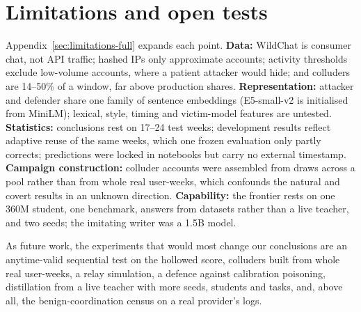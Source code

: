 \section{Limitations and open tests}
\label{sec:limitations}

Appendix~\ref{sec:limitations-full} expands each point. \textbf{Data:} WildChat is consumer chat, not API traffic; hashed IPs only approximate accounts; activity thresholds exclude low-volume accounts, where a patient attacker would hide; and colluders are 14--50\% of a window, far above production shares. \textbf{Representation:} attacker and defender share one family of sentence embeddings (E5-small-v2 is initialised from MiniLM); lexical, style, timing and victim-model features are untested. \textbf{Statistics:} conclusions rest on 17--24 test weeks; development results reflect adaptive reuse of the same weeks, which one frozen evaluation only partly corrects; predictions were locked in notebooks but carry no external timestamp. \textbf{Campaign construction:} colluder accounts were assembled from draws across a pool rather than from whole real user-weeks, which confounds the natural and covert results in an unknown direction. \textbf{Capability:} the frontier rests on one 360M student, one benchmark, answers from datasets rather than a live teacher, and two seeds; the imitating writer was a 1.5B model.

As future work, the experiments that would most change our conclusions are an anytime-valid sequential test on the hollowed score, colluders built from whole real user-weeks, a relay simulation, a defence against calibration poisoning, distillation from a live teacher with more seeds, students and tasks, and, above all, the benign-coordination census on a real provider's logs.

